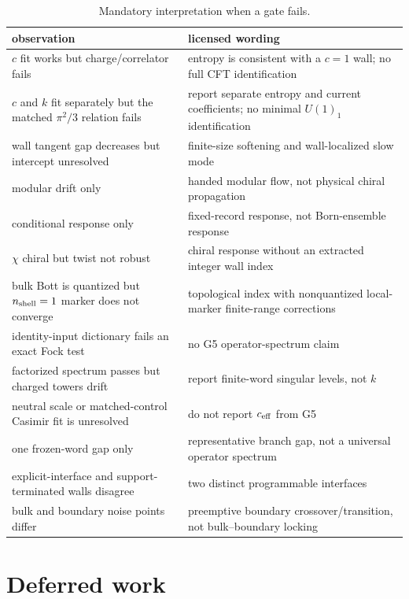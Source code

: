 \documentclass[aps,prx,twocolumn,floatfix,nofootinbib,superscriptaddress,longbibliography]{revtex4-2}
\newcommand{\campaignTableSetup}{%
  \footnotesize
  \setlength{\tabcolsep}{4pt}%
  \renewcommand{\arraystretch}{1.12}%
}
\begin{document}
\begin{table}[t]
\campaignTableSetup
\caption{Mandatory interpretation when a gate fails.}
\begin{tabularx}{\textwidth}{@{}L{0.70}L{1.30}@{}}
\toprule
observation & licensed wording \\
\midrule
$c$ fit works but charge/correlator fails & entropy is consistent with a $c=1$ wall; no full CFT identification \\
$c$ and $k$ fit separately but the matched $\pi^2/3$ relation fails & report separate entropy and current coefficients; no minimal $U(1)_1$ identification \\
wall tangent gap decreases but intercept unresolved & finite-size softening and wall-localized slow mode \\
modular drift only & handed modular flow, not physical chiral propagation \\
conditional response only & fixed-record response, not Born-ensemble response \\
$\chi$ chiral but twist not robust & chiral response without an extracted integer wall index \\
bulk Bott is quantized but $n_{\rm shell}=1$ marker does not converge & topological index with nonquantized local-marker finite-range corrections \\
identity-input dictionary fails an exact Fock test & no G5 operator-spectrum claim \\
factorized spectrum passes but charged towers drift & report finite-word singular levels, not $k$ \\
neutral scale or matched-control Casimir fit is unresolved & do not report $c_{\rm eff}$ from G5 \\
one frozen-word gap only & representative branch gap, not a universal operator spectrum \\
explicit-interface and support-terminated walls disagree & two distinct programmable interfaces \\
bulk and boundary noise points differ & preemptive boundary crossover/transition, not bulk--boundary locking \\
\bottomrule
\end{tabularx}
\end{table}
\clearpage

\section{Deferred work}
\end{document}

